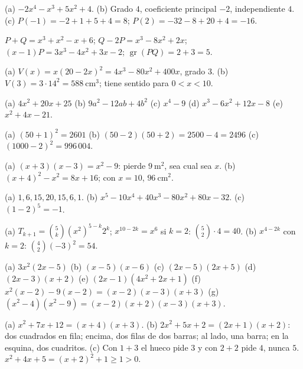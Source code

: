\documentclass[11pt,a4paper]{article}
\begin{document}
\respuestas
\begin{respuestascortas}
\begin{soluciones}
\item (a) $-2x^4-x^3+5x^2+4$. (b) Grado $4$, coeficiente principal $-2$, independiente $4$. (c) $P(-1)=-2+1+5+4=8$; $P(2)=-32-8+20+4=-16$.
\item $P+Q=x^3+x^2-x+6$; $Q-2P=x^3-8x^2+2x$; $(x-1)P=3x^3-4x^2+3x-2$; $\operatorname{gr}(PQ)=2+3=5$.
\item (a) $V(x)=x(20-2x)^2=4x^3-80x^2+400x$, grado $3$. (b) $V(3)=3\cdot14^2=\SI{588}{\centi\metre\cubed}$; tiene sentido para $0<x<10$.
\item (a) $4x^2+20x+25$ (b) $9a^2-12ab+4b^2$ (c) $x^4-9$ (d) $x^3-6x^2+12x-8$ (e) $x^2+4x-21$.
\item (a) $(50+1)^2=2601$ (b) $(50-2)(50+2)=2500-4=2496$ (c) $(1000-2)^2=996\,004$.
\item (a) $(x+3)(x-3)=x^2-9$: pierde $\SI{9}{\metre\squared}$, sea cual sea $x$. (b) $(x+4)^2-x^2=8x+16$; con $x=10$, $\SI{96}{\centi\metre\squared}$.
\item (a) $1,6,15,20,15,6,1$. (b) $x^5-10x^4+40x^3-80x^2+80x-32$. (c) $(1-2)^5=-1$.
\item (a) $T_{k+1}=\binom5k(x^2)^{5-k}2^k$; $x^{10-2k}=x^6$ si $k=2$: $\binom52\cdot4=40$. (b) $x^{4-2k}$ con $k=2$: $\binom42(-3)^2=54$.
\item (a) $3x^2(2x-5)$ (b) $(x-5)(x-6)$ (c) $(2x-5)(2x+5)$ (d) $(2x-3)(x+2)$ (e) $(2x-1)(4x^2+2x+1)$ (f) $x^2(x-2)-9(x-2)=(x-2)(x-3)(x+3)$ (g) $(x^2-4)(x^2-9)=(x-2)(x+2)(x-3)(x+3)$.
\item (a) $x^2+7x+12=(x+4)(x+3)$. (b) $2x^2+5x+2=(2x+1)(x+2)$: dos cuadrados en fila; encima, dos filas de dos barras; al lado, una barra; en la esquina, dos cuadritos. (c) Con $1+3$ el hueco pide $3$ y con $2+2$ pide $4$, nunca $5$. $x^2+4x+5=(x+2)^2+1\ge1>0$.
\end{soluciones}
\end{respuestascortas}
\end{document}
